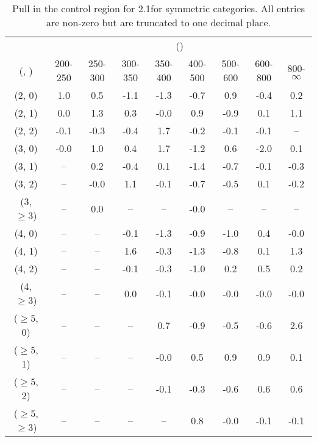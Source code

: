 \begin{table}[h!]
\tiny
\centering
\caption{Pull in the \mmj control region for 2.1\ifb for symmetric categories. All entries are non-zero but are truncated to one decimal place.\label{tab:pullsepnaive_mumu_ewk_sym}}
\begin{tabular}
{ccccccccc}
	\hline\hline
	& \multicolumn{8}{c}{\scalht (\gev)} \\ 
	 (\njet,  \nb) & 200-250 & 250-300 & 300-350 & 350-400 & 400-500 & 500-600 & 600-800 & 800-$\infty$ \\ [0.8ex] 
\hline
	(2, 0) & 1.0 & 0.5 & -1.1 & -1.3 & -0.7 & 0.9 & -0.4 & 0.2 \\[0.5ex] 
	(2, 1) & 0.0 & 1.3 & 0.3 & -0.0 & 0.9 & -0.9 & 0.1 & 1.1 \\[0.5ex] 
	(2, 2) & -0.1 & -0.3 & -0.4 & 1.7 & -0.2 & -0.1 & -0.1 & -- \\[0.5ex] 
	(3, 0) & -0.0 & 1.0 & 0.4 & 1.7 & -1.2 & 0.6 & -2.0 & 0.1 \\[0.5ex] 
	(3, 1) & -- & 0.2 & -0.4 & 0.1 & -1.4 & -0.7 & -0.1 & -0.3 \\[0.5ex] 
	(3, 2) & -- & -0.0 & 1.1 & -0.1 & -0.7 & -0.5 & 0.1 & -0.2 \\[0.5ex] 
	(3, $\ge3$) & -- & 0.0 & -- & -- & -0.0 & -- & -- & -- \\[0.5ex] 
	(4, 0) & -- & -- & -0.1 & -1.3 & -0.9 & -1.0 & 0.4 & -0.0 \\[0.5ex] 
	(4, 1) & -- & -- & 1.6 & -0.3 & -1.3 & -0.8 & 0.1 & 1.3 \\[0.5ex] 
	(4, 2) & -- & -- & -0.1 & -0.3 & -1.0 & 0.2 & 0.5 & 0.2 \\[0.5ex] 
	(4, $\ge3$) & -- & -- & 0.0 & -0.1 & -0.0 & -0.0 & -0.0 & -0.0 \\[0.5ex] 
	($\ge5$, 0) & -- & -- & -- & 0.7 & -0.9 & -0.5 & -0.6 & 2.6 \\[0.5ex] 
	($\ge5$, 1) & -- & -- & -- & -0.0 & 0.5 & 0.9 & 0.9 & 0.1 \\[0.5ex] 
	($\ge5$, 2) & -- & -- & -- & -0.1 & -0.3 & -0.6 & 0.6 & 0.6 \\[0.5ex] 
	($\ge5$, $\ge3$) & -- & -- & -- & -- & 0.8 & -0.0 & -0.1 & -0.1 \\[0.5ex] 
	\hline
	\hline
\end{tabular}
\end{table}
